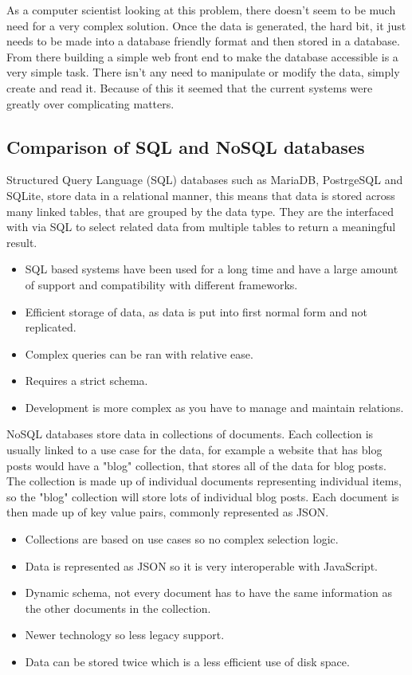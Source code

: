 As a computer scientist looking at this problem, there doesn't seem to be much need for a very complex solution. Once the data is generated, the hard bit, it just needs to be made into a database friendly format and then stored in a database. From there building a simple web front end to make the database accessible is a very simple task. There isn't any need to manipulate or modify the data, simply create and read it. Because of this it seemed that the current systems were greatly over complicating matters.

  \subsection{Comparison of SQL and NoSQL databases}
  Structured Query Language (SQL) databases such as MariaDB, PostrgeSQL and SQLite, store data in a relational manner, this means that data is stored across many linked tables, that are grouped by the data type. They are the interfaced with via SQL to select related data from multiple tables to return a meaningful result. 
  
  \begin{itemize}
    \item SQL based systems have been used for a long time and have a large amount of support and compatibility with different frameworks. 
    \item Efficient storage of data, as data is put into first normal form and not replicated.
    \item Complex queries can be ran with relative ease.
    \item Requires a strict schema.
    \item Development is more complex as you have to manage and maintain relations.
  \end{itemize}

  NoSQL databases store data in collections of documents. Each collection is usually linked to a use case for the data, for example a website that has blog posts would have a "blog" collection, that stores all of the data for blog posts. The collection is made up of individual documents representing individual items, so the "blog" collection will store lots of individual blog posts. Each document is then made up of key value pairs, commonly represented as JSON. 

  \begin{itemize}
    \item Collections are based on use cases so no complex selection logic.
    \item Data is represented as JSON so it is very interoperable with JavaScript.
    \item Dynamic schema, not every document has to have the same information as the other documents in the collection.
    \item Newer technology so less legacy support.
    \item Data can be stored twice which is a less efficient use of disk space.
  \end{itemize}

